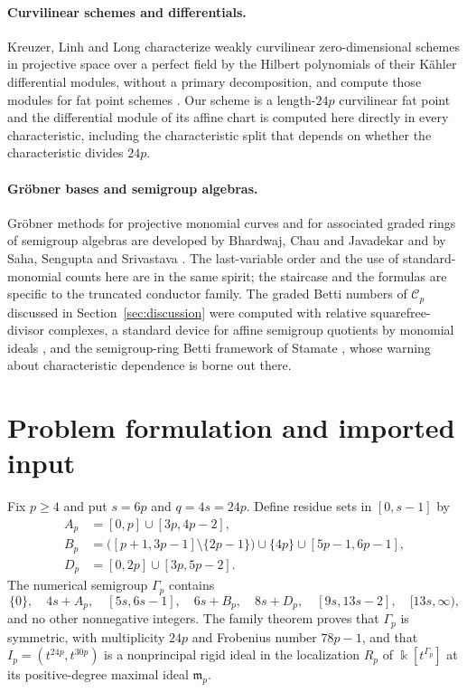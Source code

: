\documentclass[11pt]{article}
\theoremstyle{definition}
\theoremstyle{remark}
\newcommand{\kfield}{\Bbbk}
\newcommand{\Cfiber}{\mathcal{C}}
\begin{document}
\paragraph{Curvilinear schemes and differentials.}
Kreuzer, Linh and Long characterize weakly curvilinear zero-dimensional schemes in projective
space over a perfect field by the Hilbert polynomials of their K\"ahler differential modules,
without a primary decomposition, and compute those modules for fat point schemes
\cite{KreuzerLinhLong2023}. Our scheme is a length-$24p$ curvilinear fat point and the
differential module of its affine chart is computed here directly in every characteristic,
including the characteristic split that depends on whether the characteristic divides $24p$.

\paragraph{Gr\"obner bases and semigroup algebras.}
Gr\"obner methods for projective monomial curves and for associated graded rings of semigroup
algebras are developed by Bhardwaj, Chau and Javadekar and by Saha, Sengupta and Srivastava
\cite{BhardwajChauJavadekar2025,SahaSenguptaSrivastava2022}. The last-variable order and the use
of standard-monomial counts here are in the same spirit; the staircase and the formulas are
specific to the truncated conductor family. The graded Betti numbers of $\Cfiber_p$ discussed
in Section~\ref{sec:discussion} were computed with relative squarefree-divisor complexes, a
standard device for affine semigroup quotients by monomial ideals
\cite{BrunsHerzog1997}, and the semigroup-ring Betti framework of Stamate
\cite{Stamate2018}, whose warning about characteristic dependence is borne out there.

\section{Problem formulation and imported input}\label{sec:problem}

Fix $p\geq4$ and put $s=6p$ and $q=4s=24p$. Define residue sets in $[0,s-1]$ by
\begin{align*}
A_p&=[0,p]\cup[3p,4p-2],\\
B_p&=\bigl([p+1,3p-1]\setminus\{2p-1\}\bigr)
      \cup\{4p\}\cup[5p-1,6p-1],\\
D_p&=[0,2p]\cup[3p,5p-2].
\end{align*}
The numerical semigroup $\Gamma_p$ contains
\[
\{0\},\quad 4s+A_p,\quad [5s,6s-1],\quad 6s+B_p,\quad 8s+D_p,
\quad [9s,13s-2],\quad [13s,\infty),
\]
and no other nonnegative integers. The family theorem \cite[Theorem~9.2]{SantibanezLeal2026}
proves that $\Gamma_p$ is symmetric, with multiplicity $24p$ and Frobenius number $78p-1$, and that
$I_p=(t^{24p},t^{30p})$ is a nonprincipal rigid ideal in the localization $R_p$ of
$\kfield[t^{\Gamma_p}]$ at its positive-degree maximal ideal $\mathfrak m_p$.
\end{document}
